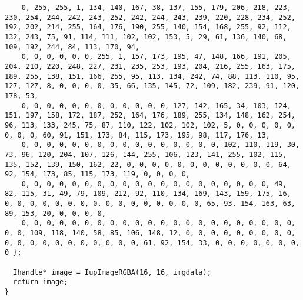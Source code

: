 \documentclass{ctexart}
\begin{document}
\begin{lstlisting}
    0, 255, 255, 1, 134, 140, 167, 38, 137, 155, 179, 206, 218, 223, 230, 254, 244, 242, 243, 252, 242, 244, 243, 239, 220, 228, 234, 252, 192, 202, 214, 255, 164, 176, 190, 255, 140, 154, 168, 255, 92, 112, 132, 243, 75, 91, 114, 111, 102, 102, 153, 5, 29, 61, 136, 140, 68, 109, 192, 244, 84, 113, 170, 94,
    0, 0, 0, 0, 0, 0, 255, 1, 157, 173, 195, 47, 148, 166, 191, 205, 204, 210, 220, 248, 227, 231, 235, 253, 193, 204, 216, 255, 163, 175, 189, 255, 138, 151, 166, 255, 95, 113, 134, 242, 74, 88, 113, 110, 95, 127, 127, 8, 0, 0, 0, 0, 35, 66, 135, 145, 72, 109, 182, 239, 91, 120, 178, 53,
    0, 0, 0, 0, 0, 0, 0, 0, 0, 0, 0, 0, 127, 142, 165, 34, 103, 124, 151, 197, 158, 172, 187, 252, 164, 176, 189, 255, 134, 148, 162, 254, 96, 113, 133, 245, 75, 87, 110, 122, 102, 102, 102, 5, 0, 0, 0, 0, 0, 0, 0, 0, 60, 91, 151, 173, 84, 115, 173, 195, 98, 117, 176, 13,
    0, 0, 0, 0, 0, 0, 0, 0, 0, 0, 0, 0, 0, 0, 0, 0, 102, 110, 119, 30, 73, 96, 120, 204, 107, 126, 144, 255, 106, 123, 141, 255, 102, 115, 135, 152, 139, 150, 162, 22, 0, 0, 0, 0, 0, 0, 0, 0, 0, 0, 0, 0, 64, 92, 154, 173, 85, 115, 173, 119, 0, 0, 0, 0,
    0, 0, 0, 0, 0, 0, 0, 0, 0, 0, 0, 0, 0, 0, 0, 0, 0, 0, 0, 0, 49, 82, 115, 31, 49, 79, 109, 212, 92, 110, 134, 169, 143, 159, 175, 16, 0, 0, 0, 0, 0, 0, 0, 0, 0, 0, 0, 0, 0, 0, 0, 0, 65, 93, 154, 163, 63, 89, 153, 20, 0, 0, 0, 0,
    0, 0, 0, 0, 0, 0, 0, 0, 0, 0, 0, 0, 0, 0, 0, 0, 0, 0, 0, 0, 0, 0, 0, 0, 109, 118, 140, 58, 85, 106, 148, 12, 0, 0, 0, 0, 0, 0, 0, 0, 0, 0, 0, 0, 0, 0, 0, 0, 0, 0, 0, 0, 61, 92, 154, 33, 0, 0, 0, 0, 0, 0, 0, 0 };

  Ihandle* image = IupImageRGBA(16, 16, imgdata);
  return image;
}


\end{lstlisting}
\end{document}

